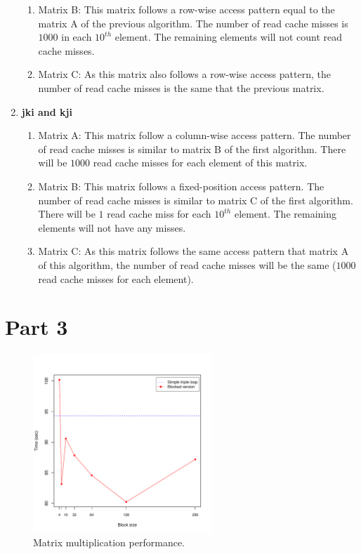 \documentclass[10pt]{scrartcl}
\begin{document}
\begin{enumerate}
\begin{enumerate}
  \item Matrix B: This matrix follows a row-wise access pattern equal to the matrix A of the previous algorithm.  The number of read cache misses is $1000$ in each $10^{th}$ element.  The remaining elements will not count read cache misses.
  \item Matrix C: As this matrix also follows a row-wise access pattern, the number of read cache misses is the same that the previous matrix.
 \end{enumerate}
 \item \textbf{jki and kji}
 \begin{enumerate}
  \item Matrix A: This matrix follow a column-wise access pattern.  The number of read cache misses is similar to matrix B of the first algorithm.  There will be $1000$ read cache misses for each element of this matrix.
  \item Matrix B: This matrix follows a fixed-position access pattern.  The number of read cache misses is similar to matrix C of the first algorithm.  There will be $1$ read cache miss for each $10^{th}$ element.  The remaining elements will not have any misses.
  \item Matrix C: As this matrix follows the same access pattern that matrix A of this algorithm, the number of read cache misses will be the same ($1000$ read cache misses for each element).
 \end{enumerate}
\end{enumerate}

\section{Part 3}
\begin{figure}
  \centering
  \includegraphics[width=0.6\textwidth]{part3}
  \caption{Matrix multiplication performance.}\label{fig:part3}
\end{figure}
\end{document}
